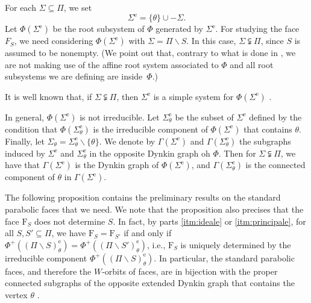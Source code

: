 \documentclass[ALCO,published]{cedram}
\theoremstyle{plain}
\newcommand\smeno{\smallsetminus}
\newcommand\erm{{\mathrm{e}}}
\begin{document}
For each $\Sigma\subseteq\Pi$, we set
$$ \Sigma^\erm=\{\theta\}\cup  -\Sigma.$$ 
Let $\Phi(\Sigma^\erm)$ be the root subsystem of $\Phi$ generated by $\Sigma^\erm$. 
For studying the face $F_S$, we need considering $\Phi(\Sigma^\erm)$ with $\Sigma=\Pi\smeno S$. 
In this case, $\Sigma\subsetneqq\Pi$, since $S$ is assumed to be nonempty.
(We point out that, contrary to what is done in \cite{CM1}, we are not making use of the affine root system associated to $\Phi$ and all root subsystems we are defining are inside~$\Phi$.)

It is well known that, if $\Sigma\subsetneqq\Pi$, then $\Sigma^\erm$  is a simple system for $\Phi(\Sigma^\erm)$ \cite[\mbox{Ch.~II, \S~5}]{Dynk}.

\par



\par
In general, $\Phi(\Sigma^\erm)$ is not irreducible.
Let  ${\Sigma^\erm_\theta}$ be the subset of $\Sigma^\erm$ defined by the condition that $\Phi({\Sigma^\erm_\theta})$ is the irreducible component of $\Phi(\Sigma^\erm)$ that contains $\theta$.  
Finally, let $\Sigma_\theta={\Sigma^\erm_\theta}\smeno \{\theta\}$.
We denote by $\Gamma(\Sigma^\erm)$ and $\Gamma(\Sigma^\erm_\theta)$ the subgraphs induced by $\Sigma^\erm$ and $\Sigma^\erm_\theta$ in the opposite Dynkin graph oh $\Phi$.
Then for $\Sigma\subsetneqq \Pi$, we have that $\Gamma(\Sigma^\erm)$ is the Dynkin graph of $\Phi(\Sigma^\erm)$, and $\Gamma(\Sigma^\erm_\theta)$ is the connected component of $\theta$ in $\Gamma(\Sigma^\erm)$.
\par

The following proposition contains the preliminary results on the standard parabolic faces that we need. 
We note that the proposition also precises that the face $\mathrm F_S$ does not determine $S$. 
In fact, by parts \ref{itm:ideale} or \ref{itm:principale}, for all $S, S'\subseteq \Pi$, we have $\mathrm F_S=\mathrm F_{S'}$ if and only if  $\Phi^+((\Pi\smeno S)^\erm_\theta) = \Phi^+((\Pi\smeno S')^\erm_\theta)$, i.e., $\mathrm F_S$ is uniquely determined by the irreducible component $\Phi^+((\Pi\smeno S)^\erm_\theta)$.
In particular, the standard parabolic faces, and therefore the $W$-orbits of faces, are in bijection with the proper connected subgraphs of the opposite extended Dynkin graph that contains the vertex $\theta$ \cite{V}.
\end{document}
